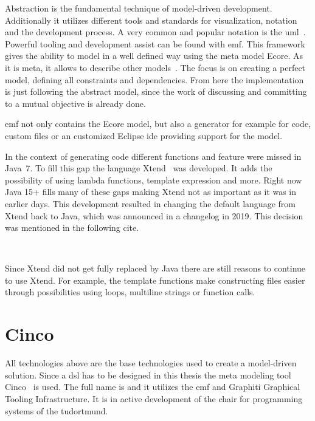 Abstraction is the fundamental technique of model-driven development. Additionally it utilizes different tools and standards for visualization, notation and the development process. A very common and popular notation is the \gls{uml}~\cite{Cook2017}. Powerful tooling and development assist can be found with \gls{emf}. This framework gives the ability to model in a well defined way using the meta model Ecore. As it is meta, it allows to describe other models~\cite[section 2.3.1]{steinberg2008emf}. The focus is on creating a perfect model, defining all constraints and dependencies. From here the implementation is just following the abstract model, since the work of discussing and committing to a mutual objective is already done.

\gls{emf} not only contains the Ecore model, but also a generator for example for code, custom files or an customized Eclipse \gls{ide} providing support for the model.

In the context of generating code different functions and feature were missed in Java~7. To fill this gap the language Xtend~\cite{xtendhp} was developed. It adds the possibility of using lambda functions,  template expression and more. Right now Java 15+ fills many of these gaps making Xtend not as important as it was in earlier days. This development resulted in changing the default language from Xtend back to Java, which was announced in a changelog in 2019. This decision was mentioned in the following cite.

~\cite{xtendToJava}

Since Xtend did not get fully replaced by Java there are still reasons to continue to use Xtend. For example, the template functions make constructing files easier through possibilities using loops, multiline strings or function calls.


\section{Cinco}

All technologies above are the base technologies used to create a model-driven solution. Since a \gls{dsl} has to be designed in this thesis the meta modeling tool Cinco~\cite{CincoHomepage} is used. The full name is  and it utilizes the \gls{emf} and Graphiti Graphical Tooling Infrastructure. It is in active development of the chair for programming systems of the \gls{tudortmund}.

